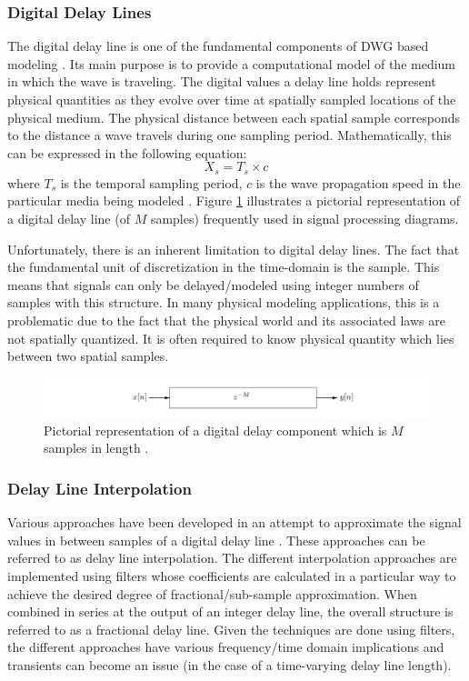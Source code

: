 \documentclass[main.tex]{subfiles}
\begin{document}
\subsubsection{Digital Delay Lines}
The digital delay line is one of the fundamental components of DWG based modeling . Its main purpose is to provide a computational model of the medium in which the wave is traveling. The digital values a delay line holds represent physical quantities as they evolve over time at spatially sampled locations of the physical medium. The physical distance between each spatial sample corresponds to the distance a wave travels during one sampling period. Mathematically, this can be expressed in the following equation:
\begin{equation}
    X_s = T_s \times c
\end{equation}
where $T_s$ is the temporal sampling period, $c$ is the wave propagation speed in the particular media being modeled . Figure \ref{fig:digitalDelayLine} illustrates a pictorial representation of a digital delay line (of $M$ samples) frequently used in signal processing diagrams.

Unfortunately, there is an inherent limitation to digital delay lines. The fact that the fundamental unit of discretization in the time-domain is the sample. This means that signals can only be delayed/modeled using integer numbers of samples with this structure. In many physical modeling applications, this is a problematic due to the fact that the physical world and its associated laws are not spatially quantized. It is often required to know physical quantity which lies between two spatial samples.

\begin{figure}[h]
    \centering
    \includegraphics[scale=.25]{./images/diagrams/digitalDelayLine.png}
    \caption{Pictorial representation of a digital delay component which is $M$ samples in length .}
    \label{fig:digitalDelayLine}
\end{figure}

\subsubsection{Delay Line Interpolation}
Various approaches have been developed in an attempt to approximate the signal values in between samples of a digital delay line . These approaches can be referred to as delay line interpolation. The different interpolation approaches are implemented using filters whose coefficients are calculated in a particular way to achieve the desired degree of fractional/sub-sample approximation. When combined in series at the output of an integer delay line, the overall structure is referred to as a fractional delay line. Given the techniques are done using filters, the different approaches have various frequency/time domain implications and transients can become an issue (in the case of a time-varying delay line length).
\end{document}
